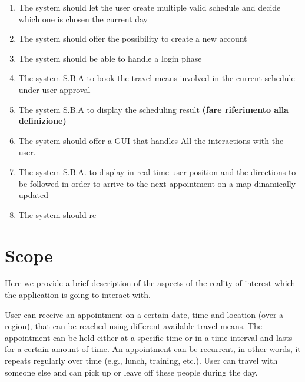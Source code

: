 \begin{enumerate}
\item The system should let the user create multiple valid schedule and decide which one is chosen the current day 
 \label{goal:G8}

\item The system should offer the possibility to create a new account \label{goal:G3}

\item The system should be able to handle a login phase \label{goal:G9}

\item The system S.B.A to book the travel means involved in the current schedule under user approval \label{goal:G4} 

\item The system S.B.A to display the scheduling result \textbf{(fare riferimento alla definizione)} \label{goal:G5}

\item The system should offer a GUI that handles All the interactions with the user. \label{goal:G6}

\item The system S.B.A. to display in real time user position and the directions to be followed in order to arrive to the next appointment on a map dinamically updated \label{G7}

\item The system should re

\end{enumerate}


\section{Scope}
Here we provide a brief description of the aspects of the reality of interest which the application is going to interact with.

User can receive an appointment on a certain date, time and location (over a region), that can be reached using different available travel means. The appointment can be held either at a specific time or in a time interval and lasts for a certain amount of time. An appointment can be recurrent, in other words, it repeats regularly over time (e.g., lunch, training, etc.). User can travel with someone else and can pick up or leave off these people during the day.

